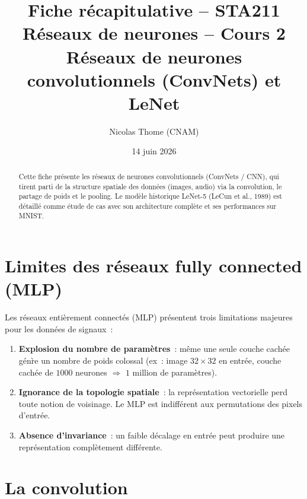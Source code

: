 \documentclass[a4paper,11pt]{article}
\title{\textbf{Fiche r\'ecapitulative -- STA211}\\[4pt]
\large R\'eseaux de neurones -- Cours 2 \\[2pt]
\small R\'eseaux de neurones convolutionnels (ConvNets) et LeNet}
\author{Nicolas Thome (CNAM)}
\date{14 juin 2026}
\theoremstyle{definition}
\theoremstyle{remark}
\begin{document}
\maketitle
\thispagestyle{empty}

\begin{abstract}
Cette fiche pr\'esente les r\'eseaux de neurones convolutionnels
(ConvNets / CNN), qui tirent parti de la structure spatiale des
donn\'ees (images, audio) via la convolution, le partage de poids
et le pooling. Le mod\`ele historique LeNet-5 (LeCun et al., 1989)
est d\'etaill\'e comme \'etude de cas avec son architecture
compl\`ete et ses performances sur MNIST.
\end{abstract}

\vfill
\tableofcontents
\newpage

\section{Limites des r\'eseaux fully connected (MLP)}

Les r\'eseaux enti\`erement connect\'es (MLP) pr\'esentent trois
limitations majeures pour les donn\'ees de signaux~:

\begin{enumerate}
  \item \textbf{Explosion du nombre de param\`etres}~: m\^eme une
    seule couche cach\'ee g\'en\`re un nombre de poids colossal
    (ex~: image $32\times 32$ en entr\'ee, couche cach\'ee de $1000$
    neurones $\Rightarrow$ $1$ million de param\`etres).
  \item \textbf{Ignorance de la topologie spatiale}~: la
    repr\'esentation vectorielle perd toute notion de voisinage.
    Le MLP est indiff\'erent aux permutations des pixels d'entr\'ee.
  \item \textbf{Absence d'invariance}~: un faible d\'ecalage en
    entr\'ee peut produire une repr\'esentation compl\`etement
    diff\'erente.
\end{enumerate}

\section{La convolution}
\end{document}
